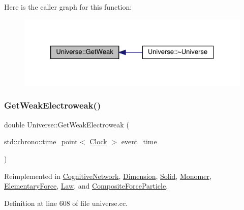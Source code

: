 Here is the caller graph for this function\+:
\nopagebreak
\begin{figure}[H]
\begin{center}
\leavevmode
\includegraphics[width=326pt]{class_universe_a4476b7e0a3fc1764909f556257fd9ec7_icgraph}
\end{center}
\end{figure}
\mbox{\label{class_universe_a645299738e6b798a037f2a15a2e7cf4d}} 
\subsubsection{\texorpdfstring{Get\+Weak\+Electroweak()}{GetWeakElectroweak()}}
{\footnotesize\ttfamily double Universe\+::\+Get\+Weak\+Electroweak (\begin{DoxyParamCaption}\item[{std\+::chrono\+::time\+\_\+point$<$ \hyperlink{universe_8h_a0ef8d951d1ca5ab3cfaf7ab4c7a6fd80}{Clock} $>$}]{event\+\_\+time }\end{DoxyParamCaption})\hspace{0.3cm}{\ttfamily [virtual]}}



Reimplemented in \hyperlink{class_cognitive_network_aa6342c390fe8e7c648b4c6bc8f93ba4a}{Cognitive\+Network}, \hyperlink{class_dimension_a5bb5a164564013a60728854cc2e5ddb3}{Dimension}, \hyperlink{class_solid_ac98f9c827d58a631627423e25dd611ba}{Solid}, \hyperlink{class_monomer_aec6e42dde40c5b3142fab880eabb346a}{Monomer}, \hyperlink{class_elementary_force_a928e06a1fa81b8d7ec4a426d959a0f98}{Elementary\+Force}, \hyperlink{class_law_aad6e54da64a5d8499dcb6c232aa6748f}{Law}, and \hyperlink{class_composite_force_particle_a27762218af4e3c021c89ff4792d81b41}{Composite\+Force\+Particle}.



Definition at line 608 of file universe.\+cc.

